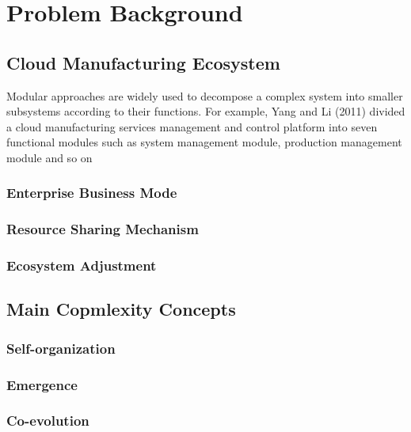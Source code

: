 \section{Problem Background} %
\label{sec:problem_background}

\subsection{Cloud Manufacturing Ecosystem} %
\label{sub:cloud_manufacturing_ecosystem}

Modular approaches are widely used to decompose a complex system into smaller subsystems according to their functions. For example, Yang and Li (2011) divided a cloud manufacturing services management and control platform into seven functional modules such as system management module, production management module and so on

\subsubsection{Enterprise Business Mode}

\subsubsection{Resource Sharing Mechanism}

\subsubsection{Ecosystem Adjustment}


\subsection{Main Copmlexity Concepts} %
\label{sub:main_copmlexity_concepts}

\subsubsection{Self-organization}

\subsubsection{Emergence}

\subsubsection{Co-evolution}

